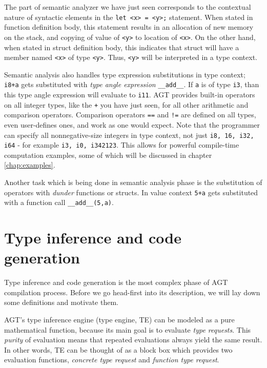 \documentclass[times, utf8, diplomski]{fer}
\theoremstyle{definition}
\begin{document}
The part of semantic analyzer we have just seen corresponds to the
contextual nature of syntactic elements in the \texttt{let <x> = <y>;} statement.
When stated in function definition body, this statement results in an allocation 
of new memory on the stack,
and copying of value of \texttt{<y>} to location of \texttt{<x>}.
On the other hand, when stated in struct definition body, this indicates that
struct will have a member named \texttt{<x>} of type \texttt{<y>}. 
Thus, \texttt{<y>} will be interpreted in a type context.

Semantic analysis also handles type expression substitutions in type context; 
\texttt{i8+a} gets substituted with
\textit{type angle expression} \texttt{\_\_add\_\_<i8, a>}. If \texttt{a} is of type \texttt{i3},
than this type angle expression will evaluate to \texttt{i11}. AGT provides built-in operators
on all integer types, like the \texttt{+} you have just seen, for all other arithmetic and
comparison operators. Comparison operators \texttt{==} and \texttt{!=} are defined on all types, 
even user-defines ones, and work as one would expect.
Note that the programmer can specify all nonnegative-size 
integers in type context, not just \texttt{i8, 16, i32, i64} - 
for example \texttt{i3, i0, i342123}.
This allows for powerful compile-time computation examples, 
some of which will be discussed in chapter \ref{chap:examples}.

Another task which is being done in semantic analysis phase is the substitution of operators with 
\textit{dunder} functions or structs. In value context \texttt{5+a} gets
substituted with a function call \texttt{\_\_add\_\_(5,a)}. 


\section{Type inference and code generation}\label{sect:codegen}

Type inference and code generation is the most complex phase of AGT compilation process.
Before we go head-first into its description, we will lay down some definitions
and motivate them. 

AGT's type inference engine (type engine, TE) can be modeled as a 
pure mathematical function, because its main goal is to evaluate \textit{type requests}.
This \textit{purity} of evaluation means that repeated evaluations always yield the same result.
In other words, TE can be thought of as a block box which provides two evaluation functions,
\textit{concrete type request} and \textit{function type request}.
\end{document}
